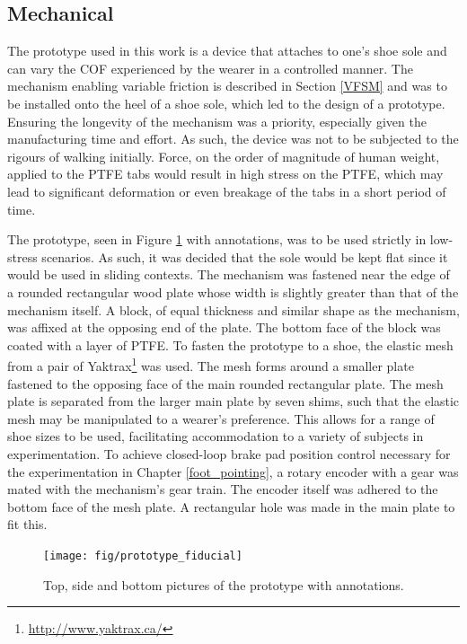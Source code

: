 \documentclass [12pt,letterpaper]{report}
\begin{document}
\subsection{Mechanical}

The prototype used in this work is a device that attaches to one's shoe sole and can vary the COF experienced by the wearer in a controlled manner. The mechanism enabling variable friction is described in Section \ref{VFSM} and was to be installed onto the heel of a shoe sole, which led to the design of a prototype. Ensuring the longevity of the mechanism was a priority, especially given the manufacturing time and effort. As such, the device was not to be subjected to the rigours of walking initially. Force, on the order of magnitude of human weight, applied to the PTFE tabs would result in high stress on the PTFE, which may lead to significant deformation or even breakage of the tabs in a short period of time.

The prototype, seen in Figure \ref{prototype_fiducial} with annotations, was to be used strictly in low-stress scenarios. As such, it was decided that the sole would be kept flat since it would be used in sliding contexts. The mechanism was fastened near the edge of a rounded rectangular wood plate whose width is slightly greater than that of the mechanism itself. A block, of equal thickness and similar shape as the mechanism, was affixed at the opposing end of the plate. The bottom face of the block was coated with a layer of PTFE. To fasten the prototype to a shoe, the elastic mesh from a pair of Yaktrax\textsuperscript{\textregistered}\footnote{\url{http://www.yaktrax.ca/}} was used. The mesh forms around a smaller plate fastened to the opposing face of the main rounded rectangular plate. The mesh plate is separated from the larger main plate by seven shims, such that the elastic mesh may be manipulated to a wearer's preference. This allows for a range of shoe sizes to be used, facilitating accommodation to a variety of subjects in experimentation. To achieve closed-loop brake pad position control necessary for the experimentation in Chapter \ref{foot_pointing}, a rotary encoder with a gear was mated with the mechanism's gear train. The encoder itself was adhered to the bottom face of the mesh plate. A rectangular hole was made in the main plate to fit this. 

\begin{figure}[tpb]
  \centering
  \texttt{[image: fig/prototype\_fiducial]}
  \caption{Top, side and bottom pictures of the prototype with annotations.}
  \label{prototype_fiducial}
\end{figure}
\end{document}
